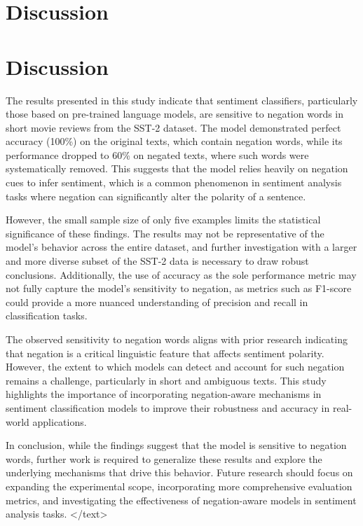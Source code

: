 \documentclass{article}
\begin{document}
\section{Discussion}
\section{Discussion}

The results presented in this study indicate that sentiment classifiers, particularly those based on pre-trained language models, are sensitive to negation words in short movie reviews from the SST-2 dataset. The model demonstrated perfect accuracy (100\%) on the original texts, which contain negation words, while its performance dropped to 60\% on negated texts, where such words were systematically removed. This suggests that the model relies heavily on negation cues to infer sentiment, which is a common phenomenon in sentiment analysis tasks where negation can significantly alter the polarity of a sentence.

However, the small sample size of only five examples limits the statistical significance of these findings. The results may not be representative of the model's behavior across the entire dataset, and further investigation with a larger and more diverse subset of the SST-2 data is necessary to draw robust conclusions. Additionally, the use of accuracy as the sole performance metric may not fully capture the model's sensitivity to negation, as metrics such as F1-score could provide a more nuanced understanding of precision and recall in classification tasks.

The observed sensitivity to negation words aligns with prior research indicating that negation is a critical linguistic feature that affects sentiment polarity. However, the extent to which models can detect and account for such negation remains a challenge, particularly in short and ambiguous texts. This study highlights the importance of incorporating negation-aware mechanisms in sentiment classification models to improve their robustness and accuracy in real-world applications.

In conclusion, while the findings suggest that the model is sensitive to negation words, further work is required to generalize these results and explore the underlying mechanisms that drive this behavior. Future research should focus on expanding the experimental scope, incorporating more comprehensive evaluation metrics, and investigating the effectiveness of negation-aware models in sentiment analysis tasks.
</text>
\end{document}
